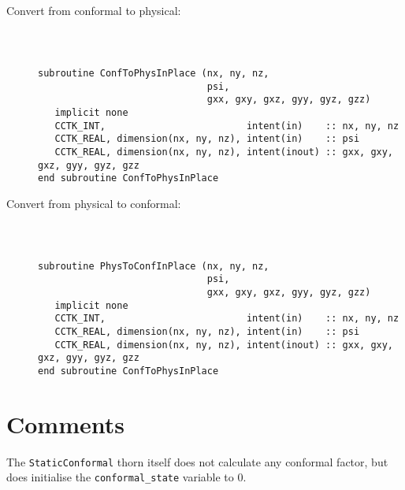 \documentclass{article}
\begin{document}
\begin{description}

\item[Convert from conformal to physical:]

{\tt
\begin{verbatim}

subroutine ConfToPhysInPlace (nx, ny, nz,
                              psi,
                              gxx, gxy, gxz, gyy, gyz, gzz)
   implicit none
   CCTK_INT,                         intent(in)    :: nx, ny, nz
   CCTK_REAL, dimension(nx, ny, nz), intent(in)    :: psi
   CCTK_REAL, dimension(nx, ny, nz), intent(inout) :: gxx, gxy, gxz, gyy, gyz, gzz
end subroutine ConfToPhysInPlace
\end{verbatim}
}

\item[Convert from physical to conformal:]

{\tt
\begin{verbatim}

subroutine PhysToConfInPlace (nx, ny, nz,
                              psi,
                              gxx, gxy, gxz, gyy, gyz, gzz)
   implicit none
   CCTK_INT,                         intent(in)    :: nx, ny, nz
   CCTK_REAL, dimension(nx, ny, nz), intent(in)    :: psi
   CCTK_REAL, dimension(nx, ny, nz), intent(inout) :: gxx, gxy, gxz, gyy, gyz, gzz
end subroutine ConfToPhysInPlace
\end{verbatim}
}

\end{description}

\section{Comments}

The {\tt StaticConformal} thorn itself does not calculate any conformal
factor, but does initialise the {\tt conformal\_state} variable to 0. 

\end{document}
